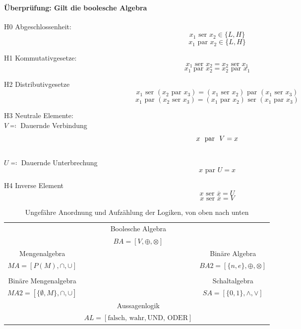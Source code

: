 \documentclass[a4paper]{scrartcl}
\begin{document}
				 \paragraph{Überprüfung: Gilt die boolesche Algebra}
				 
				 
				 H0 Abgeschlossenheit:
				 \[ x_1 \text{ ser } x_2 \in \{ L, H \} \]
				 \[ x_1 \text{ par } x_2 \in \{ L, H \} \]
				 
				 H1 Kommutativgesetze:
				 \[x_1 \text{ ser }  x_2 = x_2 \text{ ser } x_1 \]
				 \[x_1 \text{ par } x_2 = x_2 \text{ par } x_1 \]
				 
				 H2 Distributivgesetze
				 \[ x_1 \text{ ser } (x_2 \text{ par }  x_3 ) = (x_1 \text{ ser } x_2) \text{ par }  (x_1 \text{ ser } x_3) \]
				 \[ x_1 \text{ par }  (x_2 \text{ ser } x_3 ) = (x_1 \text{ par }  x_2) \text{ ser } (x_1 \text{ par }  x_3) \]
				 
				 H3 Neutrale Elemente:\\
				 \( V \eqqcolon \) Dauernde Verbindung
				 \[ x \text{ \text{ par }  } V = x \]
				 \\
				 \( U \eqqcolon \) Dauernde Unterbrechung\\
				 \[ x \text{ par }  U = x \]
				 
				 H4 Inverse Element
				 \[x \text{ ser } \overline{x} = U \]
				 \[x \text{ ser }  \overline{x} = V \]
				 
				 \begin{table}[H]
				 	\centering
				 	\begin{tabular}{|c c c|}
				 		\hline
				 		&Boolesche Algebra & \\
				 		& \( BA = [V, \oplus , \otimes  ] \) &\\
				 		Mengenalgebra & & Binäre Algebra \\
				 		\( MA = [ P(M), \cap , \cup  ] \) && \(BA2 = [ \{ n, e \}, \oplus , \otimes ] \) \\
				 		&&\\
				 		Binäre Mengenalgebra && Schaltalgebra\\
				 		\(MA2 = [\{ \emptyset , M  \}, \cap , \cup ]\) && \( SA = [\{0, 1 \}, \wedge , \vee] \)\\
				 		&Aussagenlogik&\\
				 		&\( AL = [{\text{falsch, wahr}}, \text{UND, ODER} ] \)&\\ \hline
				 	\end{tabular}
			 	\caption{Ungefähre Anordnung und Aufzählung der Logiken, von oben nach unten}
				 \end{table}
				 
\end{document}
